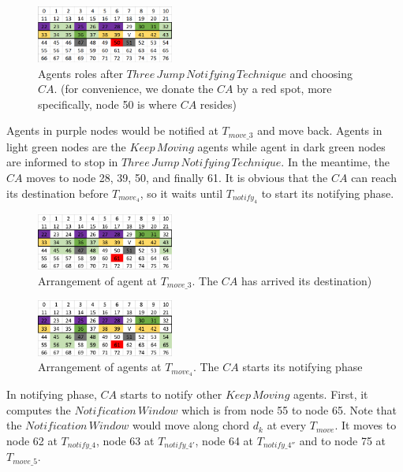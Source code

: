 \documentclass[conference]{IEEEtran}
\begin{document}
\begin{figure}[H]
  \centering  
  \includegraphics[width=0.4\textwidth]{figures/T50.png}
  \caption{Agents roles after $Three\,Jump\,Notifying\,Technique$ and choosing $CA$. (for convenience, we donate the $CA$ by a red spot, more specifically, node 50 is where $CA$ resides)}\label{fig:T50}
\end{figure}

Agents in purple nodes would be notified at $T_{move\_3}$ and move back. Agents in light green nodes are the $Keep\,Moving$ agents while agent in dark green nodes are informed to stop in $Three\,Jump\,Notifying\,Technique$. In the meantime, the $CA$ moves to node 28, 39, 50, and finally 61. It is obvious that the $CA$ can reach its destination before $T_{move_4}$, so it waits until $T_{notify_4}$ to start its notifying phase. 

\begin{figure}[H]
  \centering  
  \includegraphics[width=0.4\textwidth]{figures/T611.png}
  \caption{Arrangement of agent at $T_{move\_3}$. The $CA$ has arrived its destination)}\label{fig:T611}
\end{figure}

\begin{figure}[H]
  \centering  
  \includegraphics[width=0.4\textwidth]{figures/T612.png}
  \caption{Arrangement of agents at $T_{move_4}$. The $CA$ starts its notifying phase}\label{fig:T612}
\end{figure}
In notifying phase, $CA$ starts to notify other $Keep\,Moving$ agents. First, it computes the $Notification\,Window$ which is from node 55 to node 65. Note that the $Notification\,Window$ would move along chord $d_k$ at every $T_{move}$. It moves to node 62 at $T_{notify\_4}$, node 63 at $T_{notify\_4'}$, node 64 at $T_{notify\_4''}$ and to node 75 at $T_{move\_5}$.
\end{document}
